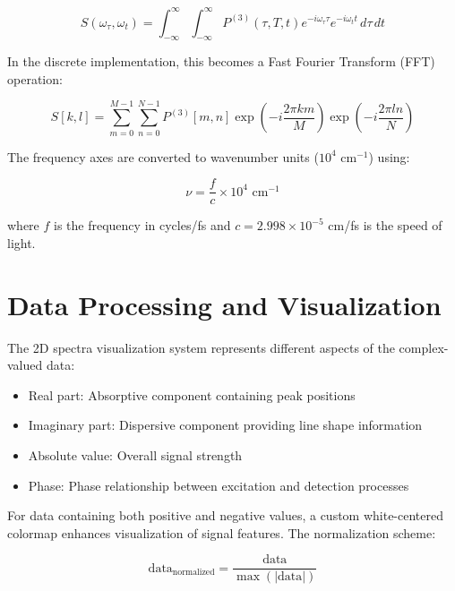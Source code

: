 \begin{equation}
    \label{eq:2d_fourier_transform}
    S(\omega_\tau, \omega_t) = \int_{-\infty}^{\infty} \int_{-\infty}^{\infty} P^{(3)}(\tau, T, t) e^{-i\omega_\tau \tau} e^{-i\omega_t t} \, d\tau \, dt
\end{equation}

\noindent
In the discrete implementation, this becomes a Fast Fourier Transform (FFT) operation:

\begin{equation}
    \label{eq:discrete_2d_fft}
    S[k,l] = \sum_{m=0}^{M-1} \sum_{n=0}^{N-1} P^{(3)}[m,n] \exp\left(-i\frac{2\pi km}{M}\right) \exp\left(-i\frac{2\pi ln}{N}\right)
\end{equation}

\noindent
The frequency axes are converted to wavenumber units ($10^4$ cm$^{-1}$) using:

\begin{equation}
    \label{eq:frequency_to_wavenumber}
    \nu = \frac{f}{c} \times 10^4 \text{ cm}^{-1}
\end{equation}

\noindent
where $f$ is the frequency in cycles/fs and $c = 2.998 \times 10^{-5}$ cm/fs is the speed of light.

\section{Data Processing and Visualization}
\label{sec:data_visualization}

\noindent
The 2D spectra visualization system represents different aspects of the complex-valued data:

\begin{itemize}
    \item Real part: Absorptive component containing peak positions
    \item Imaginary part: Dispersive component providing line shape information
    \item Absolute value: Overall signal strength
    \item Phase: Phase relationship between excitation and detection processes
\end{itemize}

\noindent
For data containing both positive and negative values, a custom white-centered colormap enhances visualization of signal features. The normalization scheme:

\begin{equation}
    \label{eq:data_normalization}
    \text{data}_{\text{normalized}} = \frac{\text{data}}{\max(|\text{data}|)}
\end{equation}

